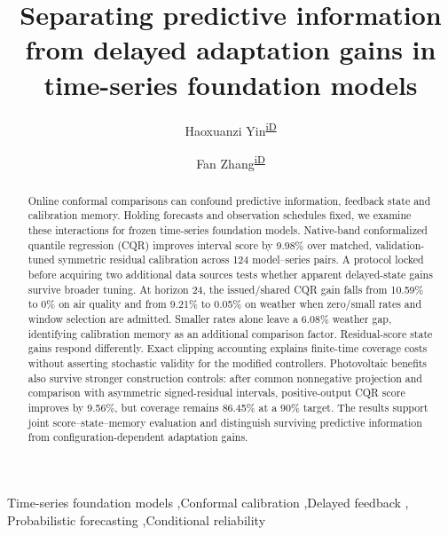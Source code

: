 \documentclass[preprint,11pt]{elsarticle}
\begin{document}
\begin{frontmatter}
\title{Separating predictive information from delayed adaptation gains in time-series foundation models}
\author[a]{Haoxuanzi Yin\textsuperscript{\href{https://orcid.org/0009-0001-1166-2216}{iD}}}
\author[b]{Fan Zhang\textsuperscript{\href{https://orcid.org/0009-0004-3509-7495}{iD}}}
\begin{abstract}
Online conformal comparisons can confound predictive information, feedback state and
calibration memory. Holding forecasts and observation schedules fixed, we examine these
interactions for frozen time-series foundation models. Native-band conformalized quantile
regression (CQR) improves interval score by 9.98\% over matched, validation-tuned symmetric
residual calibration across 124 model--series pairs. A protocol locked before acquiring
two additional data sources tests whether apparent delayed-state gains survive broader
tuning. At horizon 24, the issued/shared CQR gain falls from 10.59\% to 0\% on air quality
and from 9.21\% to 0.05\% on weather when zero/small rates and window selection are
admitted. Smaller rates alone leave a 6.08\% weather gap, identifying calibration memory
as an additional comparison factor. Residual-score state gains respond differently.
Exact clipping accounting explains finite-time coverage costs without asserting
stochastic validity for the modified controllers. Photovoltaic benefits also survive
stronger construction controls: after common nonnegative projection and comparison with
asymmetric signed-residual intervals, positive-output CQR score improves by 9.56\%, but
coverage remains 86.45\% at a 90\% target. The results support joint score--state--memory
evaluation and distinguish surviving predictive information from configuration-dependent
adaptation gains.

\end{abstract}
\begin{keyword}
Time-series foundation models \sep Conformal calibration \sep Delayed feedback \sep
Probabilistic forecasting \sep Conditional reliability
\end{keyword}
\end{frontmatter}
\end{document}
